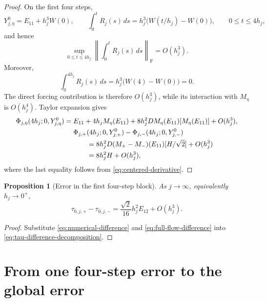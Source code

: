 \documentclass[]{article}
\numberwithin{equation}{section}
\theoremstyle{plain}
\newtheorem{proposition}[theorem]{Proposition}
\theoremstyle{remark}
\newcommand{\F}{\mathrm F}
\newcommand{\norm}[1]{\left\lVert #1\right\rVert}
\begin{document}
\begin{proof}
On the first four steps,
\begin{equation}\label{eq:full-flow-small-terms}
 Y_{j,\eta}^0=E_{11}+h_j^3W(0),
 \qquad
 \int_0^tR_j(s)\,ds=h_j^3\bigl(W(t/h_j)-W(0)\bigr),
 \qquad 0\le t\le4h_j,
\end{equation}
and hence
\begin{equation}\label{eq:full-flow-forcing-partial-bound}
 \sup_{0\le t\le4h_j}
 \norm{\int_0^tR_j(s)\,ds}_{\F}=O(h_j^3).
\end{equation}
Moreover,
\begin{equation}\label{eq:full-flow-forcing-cycle}
 \int_0^{4h_j}R_j(s)\,ds=h_j^3\bigl(W(4)-W(0)\bigr)=0.
\end{equation}
The direct forcing contribution is therefore $O(h_j^3)$, while its
interaction with $M_\eta$ is $O(h_j^4)$.  Taylor expansion gives
\begin{align}
 \Phi_{j,\eta}(4h_j;0,Y_{j,\eta}^0)
 ={}&E_{11}+4h_jM_\eta(E_{11})
 +8h_j^2DM_\eta(E_{11})[M_\eta(E_{11})]+O(h_j^3),
 \label{eq:full-flow-expansion}\\
 &\Phi_{j,+}(4h_j;0,Y_{j,+}^0)
 -\Phi_{j,-}(4h_j;0,Y_{j,-}^0)\notag\\
 &\qquad=8h_j^2D(M_+-M_-)(E_{11})[H/\sqrt2]
 +O(h_j^3)\notag\\
 &\qquad=8h_j^2H+O(h_j^3),
\end{align}
where the last equality follows from \eqref{eq:centered-derivative}.
\end{proof}

\begin{proposition}[Error in the first four-step block]
\label{prop:four-step}
As $j\to\infty$, equivalently $h_j\to0^+$,
\begin{equation}\label{eq:four-step-defect}
 \tau_{0,j,+}-\tau_{0,j,-}
 =\frac{\sqrt2}{16}h_j^2E_{12}+O(h_j^3).
\end{equation}
\end{proposition}

\begin{proof}
Substitute \eqref{eq:numerical-difference} and
\eqref{eq:full-flow-difference} into
\eqref{eq:tau-difference-decomposition}.
\end{proof}

\section{From one four-step error to the global error}
\label{sec:accumulation}
\end{document}

